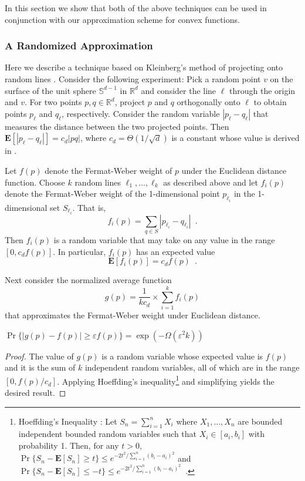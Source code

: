 \documentclass[charterfonts,lotsofwhite]{patmorin}
\newcommand{\eps}{\varepsilon}
\newcommand{\E}{\mathbf{E}}
\begin{document}
In this section we show that both of the above techniques can be used
in conjunction with our approximation scheme for convex functions.


\subsubsection{A Randomized Approximation}

Here we describe a technique based on Kleinberg's method of projecting
onto random lines \cite{k97}.  Consider the following experiment: Pick
a random point $v$ on the surface of the unit sphere
$\mathbb{S}^{d-1}$ in $\mathbb{R}^d$ and consider the line $\ell$
through the origin and $v$. For two points $p,q\in\mathbb{R}^d$,
project $p$ and $q$ orthogonally onto $\ell$ to obtain points $p_\ell$
and $q_\ell$, respectively. Consider the random variable
$|p_\ell-q_\ell|$ that measures the distance between the two projected
points.  Then $\E[|p_\ell-q_\ell|]=c_d|pq|$, where
$c_d=\Theta(1/\sqrt{d})$ is a constant whose value is derived in
.  

Let $f(p)$ denote the Fermat-Weber weight of $p$ under the Euclidean
distance function.  Choose $k$ random lines $\ell_1,\ldots,\ell_k$ as
described above and
let $f_i(p)$ denote the Fermat-Weber weight of the 1-dimensional point
$p_{\ell_i}$ in the 1-dimensional set $S_{\ell_i}$.  That is,
\[
     f_i(p) = \sum_{q\in S} |p_{\ell_i}-q_{\ell_i}| \enspace .
\]
Then $f_i(p)$ is a random variable that 
may take on any
value in the range $[0,c_df(p)]$.  In particular, $f_i(p)$
has an expected value 
\[ \E[f_i(p)]=c_df(p) \enspace . \] 

Next consider the normalized average function 
\[ g(p) = \frac{1}{kc_d}\times\sum_{i=1}^k f_i(p) \] 
that approximates the
Fermat-Weber weight under Euclidean distance.

\begin{lem}
$\Pr\{|g(p)-f(p)| \ge \eps f(p)\} = \exp(-\Omega(\eps^2k))$
\end{lem}

\begin{proof}
The value of $g(p)$ is a random variable whose expected value is
$f(p)$ and it is the sum of $k$ independent random variables, all of
which are in the range $[0,f(p)/c_d]$.  Applying Hoeffding's
inequality\footnote{Hoeffding's Inequality \cite{h63}: Let
$S_n=\sum_{i=1}^n X_i$ where $X_1,\ldots,X_n$ are
bounded independent bounded random variables such that $X_i\in[a_i,b_i]$ with probability 1.  Then, for any $t>0$,
$
    \Pr\{S_n - \E[S_n] \ge t\} 
   \le e^{-2t^2/\sum_{i=1}^n(b_i-a_i)^2}
$
and
$
    \Pr\{S_n - \E[S_n] \le -t\} 
   \le e^{-2t^2/\sum_{i=1}^n(b_i-a_i)^2} \enspace .
$
} and simplifying yields the desired
result.
\end{proof}
\end{document}
